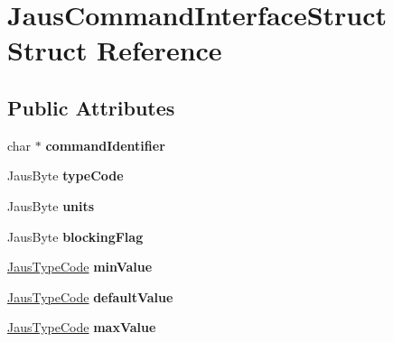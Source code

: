 \hypertarget{struct_jaus_command_interface_struct}{\section{\-Jaus\-Command\-Interface\-Struct \-Struct \-Reference}
\label{struct_jaus_command_interface_struct}
}
\subsection*{\-Public \-Attributes}
\begin{DoxyCompactItemize}
\item 
\hypertarget{struct_jaus_command_interface_struct_a21e26a8d2890c04757a171bbfe79937d}{char $\ast$ {\bfseries command\-Identifier}}\label{struct_jaus_command_interface_struct_a21e26a8d2890c04757a171bbfe79937d}

\item 
\hypertarget{struct_jaus_command_interface_struct_a65c7aa0d4b4b71d5c4a0382331878823}{\-Jaus\-Byte {\bfseries type\-Code}}\label{struct_jaus_command_interface_struct_a65c7aa0d4b4b71d5c4a0382331878823}

\item 
\hypertarget{struct_jaus_command_interface_struct_ac50fcb042720c08e555f749f782c1286}{\-Jaus\-Byte {\bfseries units}}\label{struct_jaus_command_interface_struct_ac50fcb042720c08e555f749f782c1286}

\item 
\hypertarget{struct_jaus_command_interface_struct_aeb13ecf5a8f12dae3fbe34e8a1c7d785}{\-Jaus\-Byte {\bfseries blocking\-Flag}}\label{struct_jaus_command_interface_struct_aeb13ecf5a8f12dae3fbe34e8a1c7d785}

\item 
\hypertarget{struct_jaus_command_interface_struct_a1ef7e4794f856ba705a963e8c1923eb2}{\hyperlink{union_jaus_type_code}{\-Jaus\-Type\-Code} {\bfseries min\-Value}}\label{struct_jaus_command_interface_struct_a1ef7e4794f856ba705a963e8c1923eb2}

\item 
\hypertarget{struct_jaus_command_interface_struct_ab2c75f86123d405ab438288726aacb74}{\hyperlink{union_jaus_type_code}{\-Jaus\-Type\-Code} {\bfseries default\-Value}}\label{struct_jaus_command_interface_struct_ab2c75f86123d405ab438288726aacb74}

\item 
\hypertarget{struct_jaus_command_interface_struct_a1c3f234ffe058a1f55e73f905e10cd7b}{\hyperlink{union_jaus_type_code}{\-Jaus\-Type\-Code} {\bfseries max\-Value}}\label{struct_jaus_command_interface_struct_a1c3f234ffe058a1f55e73f905e10cd7b}


\end{DoxyCompactItemize}
